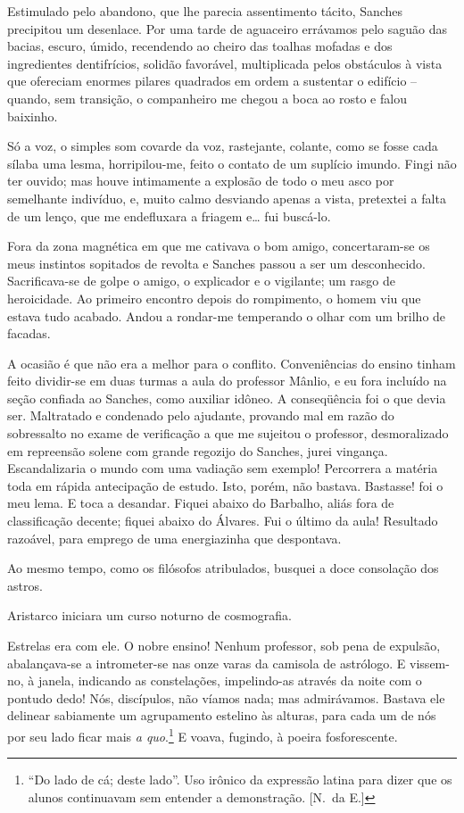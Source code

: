 Estimulado pelo abandono, que lhe parecia
assentimento tácito, Sanches precipitou um desenlace. Por uma tarde de
aguaceiro errávamos pelo saguão das bacias, escuro, úmido, recendendo
ao cheiro das toalhas mofadas e dos ingredientes dentifrícios, solidão
favorável, multiplicada pelos obstáculos à vista que ofereciam enormes
pilares quadrados em ordem a sustentar o edifício -- quando, sem
transição, o companheiro me chegou a boca ao rosto e falou baixinho. 

Só a voz, o simples som covarde da voz, rastejante, colante, como se fosse
cada sílaba uma lesma, horripilou{}-me, feito o contato de um suplício
imundo. Fingi não ter ouvido; mas houve intimamente a explosão de todo
o meu asco por semelhante indivíduo, e, muito calmo desviando apenas a
vista, pretextei a falta de um lenço, que me endefluxara a friagem e\ldots
fui buscá{}-lo. 

Fora da zona magnética em que me cativava o bom amigo,
concertaram{}-se os meus instintos sopitados de revolta e Sanches
passou a ser um desconhecido. Sacrificava{}-se de golpe o amigo, o
explicador e o vigilante; um rasgo de heroicidade. Ao primeiro encontro
depois do rompimento, o homem viu que estava tudo acabado. Andou a
rondar{}-me temperando o olhar com um brilho de facadas. 

A ocasião é que não era a melhor para o conflito. Conveniências do ensino tinham
feito dividir{}-se em duas turmas a aula do professor Mânlio, e eu fora
incluído na seção confiada ao Sanches, como auxiliar idôneo. A
conseqüência foi o que devia ser. Maltratado e condenado pelo ajudante,
provando mal em razão do sobressalto no exame de verificação a que me
sujeitou o professor, desmoralizado em repreensão solene com grande
regozijo do Sanches, jurei vingança. Escandalizaria o mundo com uma
vadiação sem exemplo! Percorrera a matéria toda em rápida antecipação
de estudo. Isto, porém, não bastava. Bastasse! foi o meu lema. E toca a
desandar. Fiquei abaixo do Barbalho, aliás fora de classificação
decente; fiquei abaixo do Álvares. Fui o último da aula! Resultado
razoável, para emprego de uma energiazinha que despontava. 

Ao mesmo tempo, como os filósofos atribulados, 
busquei a doce consolação dos astros. 

Aristarco iniciara um curso noturno de cosmografia. 

Estrelas era com ele. O nobre ensino! Nenhum professor, sob pena de expulsão,
abalançava{}-se a intrometer{}-se nas onze varas da camisola de
astrólogo. E vissem{}-no, à janela, indicando as constelações,
impelindo{}-as através da noite com o pontudo dedo! Nós, discípulos,
não víamos nada; mas admirávamos. Bastava ele delinear sabiamente um
agrupamento estelino às alturas, para cada um de nós por seu lado ficar
mais \textit{a quo}.\footnote{ ``Do lado de cá; deste lado''. Uso irônico 
da expressão latina para dizer que os alunos continuavam sem entender 
a demonstração. [N.~da E.]} E voava, fugindo, à poeira fosforescente. 

